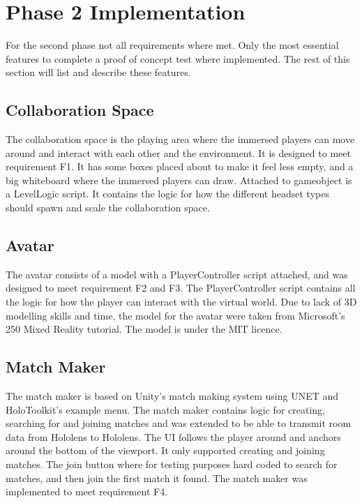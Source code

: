     \section{Phase 2 Implementation} %
    For the second phase not all requirements where met. Only the most essential features to complete a proof of concept test where implemented. The rest of this section will list and describe these features.
    
        \subsection{Collaboration Space}
        The collaboration space is the playing area where the immersed players can move around and interact with each other and the environment. It is designed to meet requirement F1. It has some boxes placed about to make it feel less empty, and a big whiteboard where the immersed players can draw. Attached to gameobject is a LevelLogic script. It contains the logic for how the different headset types should spawn and scale the collaboration space. %
        
        \subsection{Avatar}
        The avatar consists of a model with a PlayerController script attached, and was designed to meet requirement F2 and F3. The PlayerController script contains all the logic for how the player can interact with the virtual world. Due to lack of 3D modelling skills and time, the model for the avatar were taken from Microsoft's 250 Mixed Reality tutorial. The model is under the MIT licence. %
    
        \subsection{Match Maker}
        The match maker is based on Unity's match making system using UNET and HoloToolkit's example menu. The match maker contains logic for creating, searching for and joining matches and was extended to be able to transmit room data from Hololens to Hololens. The UI follows the player around and anchors around the bottom of the viewport. It only supported creating and joining matches. The join button where for testing purposes hard coded to search for matches, and then join the first match it found. The match maker was implemented to meet requirement F4. %
        
